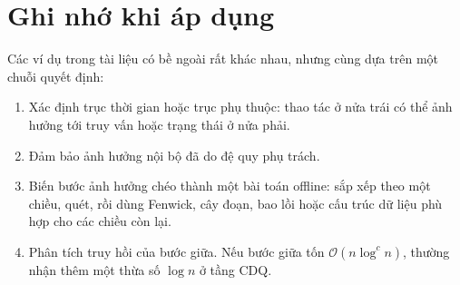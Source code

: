 \documentclass[11pt]{article}
\newcommand{\Oh}{\mathcal{O}}
\begin{document}
\section{Ghi nhớ khi áp dụng}

Các ví dụ trong tài liệu có bề ngoài rất khác nhau, nhưng cùng dựa trên một
chuỗi quyết định:
\begin{enumerate}
  \item Xác định trục thời gian hoặc trục phụ thuộc: thao tác ở nửa trái có
  thể ảnh hưởng tới truy vấn hoặc trạng thái ở nửa phải.
  \item Đảm bảo ảnh hưởng nội bộ đã do đệ quy phụ trách.
  \item Biến bước ảnh hưởng chéo thành một bài toán offline: sắp xếp theo
  một chiều, quét, rồi dùng Fenwick, cây đoạn, bao lồi hoặc cấu trúc dữ liệu
  phù hợp cho các chiều còn lại.
  \item Phân tích truy hồi của bước giữa. Nếu bước giữa tốn
  \(\Oh(n\log^c n)\), thường nhận thêm một thừa số \(\log n\) ở tầng CDQ.
\end{enumerate}
\end{document}
